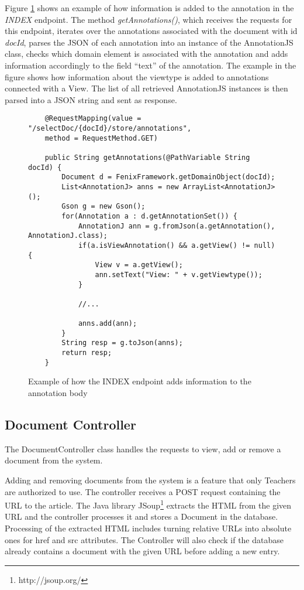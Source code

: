 Figure \ref{figure:annotationControllerIndex} shows an example of how information is added to the annotation in the \textit{INDEX} endpoint. The method \textit{getAnnotations()}, which receives the requests for this endpoint, iterates over the annotations associated with the document with id \textit{docId}, parses the JSON of each annotation into an instance of the AnnotationJS class, checks which domain element is associated with the annotation and adds information accordingly to the field ``text'' of the annotation. The example in the figure shows how information about the viewtype is added to annotations connected with a View. The list of all retrieved AnnotationJS instances is then parsed into a JSON string and sent as response.

\begin{figure}[h]
\lstset{style=customjava}
\begin{lstlisting}
	@RequestMapping(value = "/selectDoc/{docId}/store/annotations", 
	method = RequestMethod.GET)
	
	public String getAnnotations(@PathVariable String docId) {
		Document d = FenixFramework.getDomainObject(docId);
		List<AnnotationJ> anns = new ArrayList<AnnotationJ>();
		Gson g = new Gson();
		for(Annotation a : d.getAnnotationSet()) {
			AnnotationJ ann = g.fromJson(a.getAnnotation(), AnnotationJ.class);
			if(a.isViewAnnotation() && a.getView() != null) {
				View v = a.getView();
				ann.setText("View: " + v.getViewtype());
			}

			//...
			
			anns.add(ann);
		}
		String resp = g.toJson(anns);
		return resp;
	}		
\end{lstlisting}
\caption{Example of how the INDEX endpoint adds information to the annotation body}
\label{figure:annotationControllerIndex}
\end{figure}

\subsection{Document Controller}
\label{subsection:documentController}
The DocumentController class handles the requests to view, add or remove a document from the system.

Adding and removing documents from the system is a feature that only Teachers are authorized to use. The controller receives a POST request containing the URL to the article. The Java library JSoup\footnote{http://jsoup.org/} extracts the HTML from the given URL and the controller processes it and stores a Document in the database. Processing of the extracted HTML includes turning relative URLs into absolute ones for href and src attributes.
The Controller will also check if the database already contains a document with the given URL before adding a new entry. 

